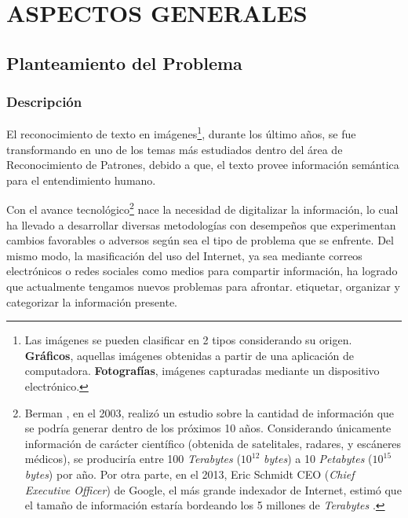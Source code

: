 \chapter{ASPECTOS GENERALES}
\label{cap:aspectosGenerales}
\setcounter{secnumdepth}{0}

\setcounter{secnumdepth}{3}
\section{Planteamiento del Problema}
\subsection{Descripción}

El reconocimiento de texto en imágenes\footnote{Las imágenes se pueden
clasificar en 2 tipos considerando su origen. \textbf{Gráficos}, aquellas
imágenes obtenidas a partir de una aplicación de computadora.
\textbf{Fotografías}, imágenes capturadas mediante un dispositivo electrónico.},
durante los último años, se fue transformando en uno de los temas más estudiados
dentro del área de Reconocimiento de Patrones, debido a que, el texto provee
información semántica para el entendimiento humano. 

Con el avance tecnológico\footnote{Berman \citep{Berman:2003:GCM}, en el 2003,
realizó un estudio sobre la cantidad de información que se podría generar dentro
de los próximos 10 años. Considerando únicamente información de carácter
científico (obtenida de satelitales, radares, y escáneres médicos), se
produciría entre 100 \textit{Terabytes} ($10^{12}$ \textit{bytes}) a 10
\textit{Petabytes} ($10^{15}$ \textit{bytes}) por año. Por otra parte, en el
2013, Eric Schmidt CEO (\textit{Chief Executive Officer}) de Google, el más
grande indexador de Internet, estimó que el tamaño de información estaría
bordeando los 5 millones de \textit{Terabytes} \citep{McGuigan:2013:HBI}.} nace
la necesidad de digitalizar la información, lo cual ha llevado a desarrollar
diversas metodologías con desempeños que experimentan cambios favorables o
adversos según sea el tipo de problema que se enfrente. Del mismo modo, la
masificación del uso del Internet, ya sea mediante correos electrónicos o redes
sociales como medios para compartir información, ha logrado que actualmente
tengamos nuevos problemas para afrontar. %
etiquetar, organizar y categorizar la información presente.

